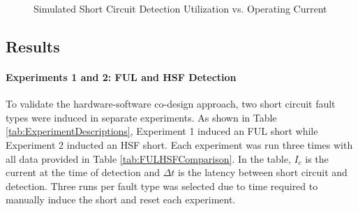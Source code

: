 \begin{figure}
\centering
{}
    \caption{Simulated Short Circuit Detection Utilization vs. Operating Current}
    \label{fig:Simulated Utilization}
\end{figure}

\clearpage \subsection{Results}\label{subsec:results}
\paragraph{Experiments 1 and 2: FUL and HSF Detection}
To validate the hardware-software co-design approach, two short circuit fault types were induced in separate experiments.
As shown in Table \ref{tab:ExperimentDescriptions}, Experiment 1 induced an FUL short while Experiment 2 inducted an HSF short.
Each experiment was run three times with all data provided in Table \ref{tab:FULHSFComparison}.
In the table, $I_{c}$ is the current at the time of detection and $\Delta t$ is the latency between short circuit and detection.
Three runs per fault type was selected due to time required to manually induce the short and reset each experiment.

